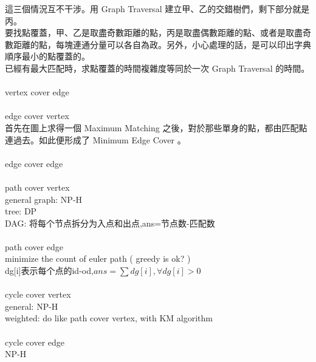 這三個情況互不干涉。用 Graph Traversal 建立甲、乙的交錯樹們，剩下部分就是丙。\\
要找點覆蓋，甲、乙是取盡奇數距離的點，丙是取盡偶數距離的點、或者是取盡奇數距離的點，每塊連通分量可以各自為政。另外，小心處理的話，是可以印出字典順序最小的點覆蓋的。\\
已經有最大匹配時，求點覆蓋的時間複雜度等同於一次 Graph Traversal 的時間。\\
\\
vertex cover edge\\
\\
edge cover vertex\\
首先在圖上求得一個 Maximum Matching 之後，對於那些單身的點，都由匹配點連過去。如此便形成了 Minimum Edge Cover 。\\
\\
edge cover edge \\
\\
path cover vertex\\
general graph: NP-H\\
tree: DP\\
DAG: 将每个节点拆分为入点和出点,ans=节点数-匹配数\\
\\
path cover edge\\
minimize the count of euler path ( greedy is ok? )\\
dg[i]表示每个点的id-od,$ans=\sum dg[i], \forall dg[i]>0$\\
\\
cycle cover vertex\\
general: NP-H\\
weighted: do like path cover vertex, with KM algorithm\\
\\
cycle cover edge\\
NP-H\\
